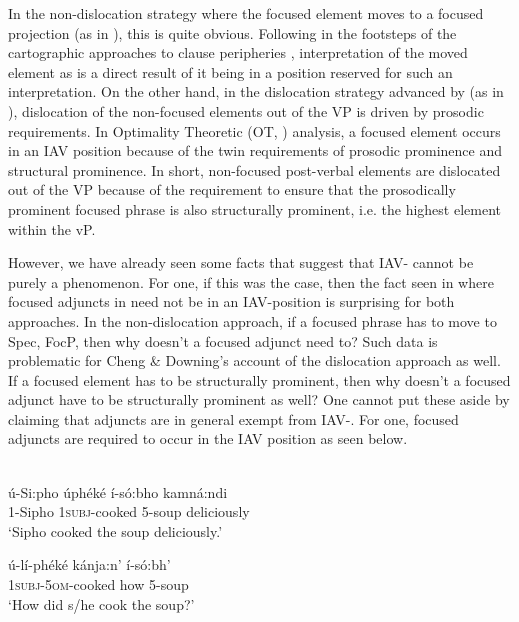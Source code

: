 \documentclass[output=paper,newtxmath,modfonts,nonflat,hidelinks]{langsci/langscibook}
\begin{document}
In the non-dislocation strategy where the focused element moves to a focused projection (as in ), this is quite obvious. Following in the footsteps of the cartographic approaches to clause peripheries \citep{rizzi1997}, interpretation of the moved element as  is a direct result of it being in a position reserved for such an interpretation. On the other hand, in the dislocation strategy advanced by \citet{chengdowning2012} (as in ), dislocation of the non-focused elements out of the VP is driven by prosodic requirements. In  Optimality Theoretic (OT, \citealt{Prince1993}) analysis, a focused element occurs in an IAV position because of the twin requirements of prosodic prominence and structural prominence. In short, non-focused post-verbal elements are dislocated out of the VP because of the requirement to ensure that the prosodically prominent focused phrase is also structurally prominent, i.e. the highest element within the vP. 

However, we have already seen some  facts that suggest that IAV- cannot be purely a  phenomenon. For one, if this was the case, then the fact seen in  where focused adjuncts in  need not be in an IAV-position is surprising for both approaches. In the non-dislocation approach, if a focused phrase has to move to Spec, FocP, then why doesn't a focused adjunct need to? Such data is problematic for Cheng \& Downing's account of the dislocation approach as well. If a focused element has to be structurally prominent, then why doesn’t a focused adjunct have to be structurally prominent as well? One cannot put these aside by claiming that adjuncts are in general exempt from IAV-. For one,  focused adjuncts are required to occur in the IAV position as seen below.

\ea\label{ex:selvanathan:12}
 \citep[8]{chengdowning2014}\\
\ea\label{ex:selvanathan:12a}
	{\gll ú-Si:pho  úphéké          í-só:bho   kamná:ndi  \\
	1-Sipho   \textsc{1subj}{}-cooked    5-soup    deliciously\\}
\glt `Sipho cooked the soup deliciously.'

\ex\label{ex:selvanathan:12b}
	{\gll ú-lí-phéké          kánja:n’    í-só:bh’     \\
\textsc{1subj}{}-\textsc{5om}{}-cooked   how     5-soup\\}
\glt `How did s/he cook the soup?'
\end{document}

